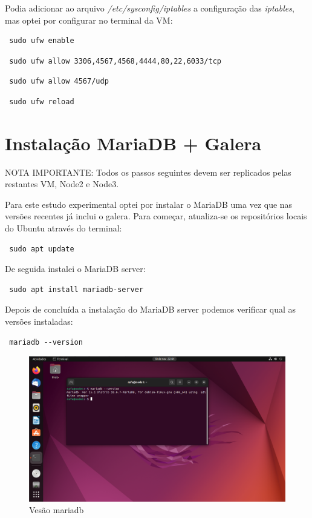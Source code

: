 \hfill \break
Podia adicionar ao arquivo \textit{/etc/sysconfig/iptables} a configuração das \textit{iptables}, mas optei por configurar no terminal da \ac{VM}:
\begin{verbatim} sudo ufw enable \end{verbatim}
\begin{verbatim} sudo ufw allow 3306,4567,4568,4444,80,22,6033/tcp \end{verbatim}
\begin{verbatim} sudo ufw allow 4567/udp \end{verbatim}
\begin{verbatim} sudo ufw reload \end{verbatim}

\newpage
\section{Instalação MariaDB + Galera}

NOTA IMPORTANTE: Todos os passos seguintes devem ser replicados pelas restantes \ac{VM}, Node2 e Node3.

Para este estudo experimental optei por instalar o MariaDB uma vez que nas versões recentes já inclui o galera.
Para começar, atualiza-se os repositórios locais do Ubuntu através do terminal:

\begin{verbatim} sudo apt update \end{verbatim}

De seguida instalei o MariaDB server:
\begin{verbatim} sudo apt install mariadb-server \end{verbatim}

Depois de concluída a instalação do MariaDB server podemos verificar qual as versões instaladas:

\begin{verbatim} mariadb --version \end{verbatim}

\begin{figure}[H]
\center
\includegraphics[width=13cm]{imagens/mariaversion.png}
\caption{Vesão mariadb}
\end{figure}

